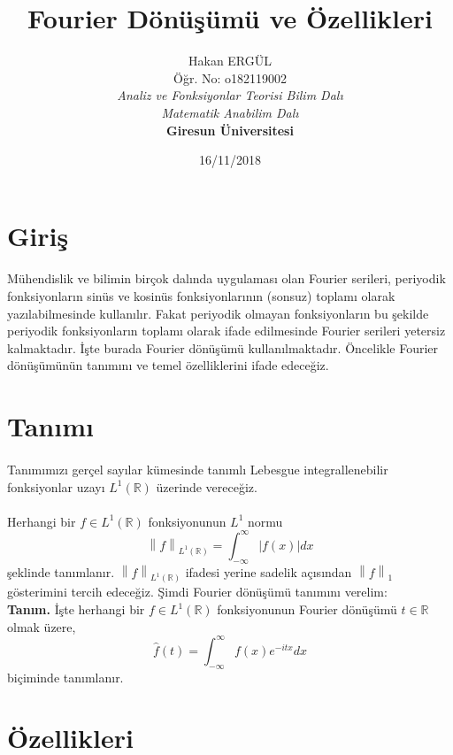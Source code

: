 \documentclass[a4paper, 10pt]{article}
\title{\textbf{Fourier Dönüşümü ve Özellikleri}}
\author{Hakan ERGÜL\\
Öğr. No: o182119002 \\
\textit{Analiz ve Fonksiyonlar Teorisi Bilim Dalı}\\
\textit{Matematik Anabilim Dalı}\\
\textbf{Giresun Üniversitesi}}
\date{16/11/2018}
\begin{document}
\maketitle

\section{Giriş}

\paragraph{}
Mühendislik ve bilimin birçok dalında uygulaması olan Fourier serileri, periyodik fonksiyonların sinüs ve kosinüs fonksiyonlarının (sonsuz) toplamı olarak yazılabilmesinde kullanılır. Fakat periyodik olmayan fonksiyonların bu şekilde periyodik fonksiyonların toplamı olarak ifade edilmesinde Fourier serileri yetersiz kalmaktadır. İşte burada Fourier dönüşümü kullanılmaktadır. Öncelikle Fourier dönüşümünün tanımını ve temel özelliklerini ifade edeceğiz.

\section{Tanımı}
\paragraph{}
Tanımımızı gerçel sayılar kümesinde tanımlı Lebesgue integrallenebilir fonksiyonlar uzayı $L^1(\mathbb{R})$ üzerinde vereceğiz.
\paragraph{}
Herhangi bir $f \in L^1(\mathbb{R})$ fonksiyonunun $L^1$ normu 
$$ \left \| f  \right \|_{ L^1(\mathbb{R}) } = \int_{-\infty }^{\infty }\left | f(x) \right | dx $$
şeklinde tanımlanır. $ \left \| f  \right \|_{ L^1(\mathbb{R})}$  ifadesi yerine sadelik açısından $\left \| f  \right \|_1$ gösterimini tercih edeceğiz. Şimdi Fourier dönüşümü tanımını verelim:\\

\textbf{Tanım.} İşte herhangi bir $f \in L^1(\mathbb{R})$ fonksiyonunun Fourier dönüşümü $t\in \mathbb{R}$ olmak üzere,
\[  \widehat{f}(t)=\int_{-\infty }^{\infty }f(x)e^{-itx}dx  \]
biçiminde tanımlanır.

\section{Özellikleri}
\end{document}
